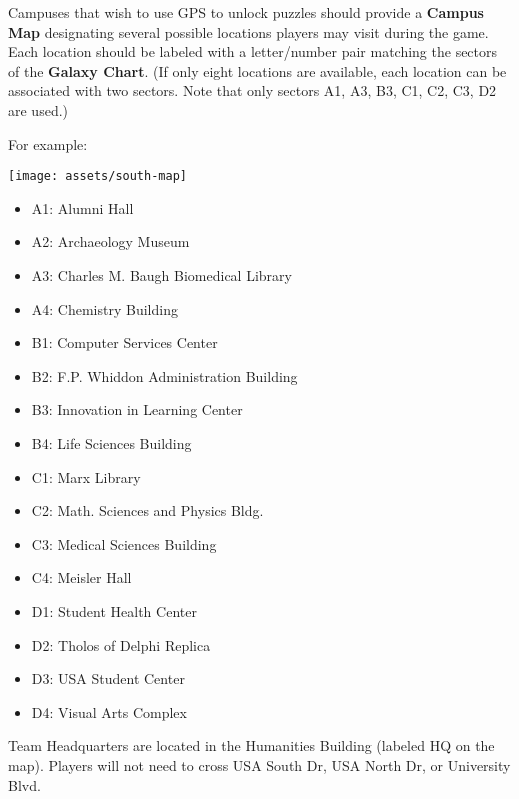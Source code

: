 Campuses that wish to use GPS to unlock puzzles should provide
a \textbf{Campus Map} designating several possible locations players
may visit during the game. Each location should be labeled with
a letter/number pair matching the sectors of the \textbf{Galaxy Chart}.
(If only eight locations are available, each location can be associated
with two sectors. Note that only sectors 
A1, A3, B3, C1,
C2, C3, D2 are used.)

For example:

\begin{center}
  \texttt{[image: assets/south-map]}
\end{center}

\begin{multicols}{2}
  \begin{itemize}
    \item A1: Alumni Hall
    \item A2: Archaeology Museum
    \item A3: Charles M. Baugh Biomedical Library
    \item A4: Chemistry Building
    \item B1: Computer Services Center
    \item B2: F.P. Whiddon Administration Building %
    \item B3: Innovation in Learning Center
    \item B4: Life Sciences Building
    \item C1: Marx Library
    \item C2: Math. Sciences and Physics Bldg. 
    \item C3: Medical Sciences Building
    \item C4: Meisler Hall %
    \item D1: Student Health Center
    \item D2: Tholos of Delphi Replica
    \item D3: USA Student Center
    \item D4: Visual Arts Complex
  \end{itemize}
\end{multicols}

Team Headquarters are located in the Humanities
Building (labeled HQ on the map).
Players will not need to cross USA South Dr, USA North Dr, or University Blvd.
